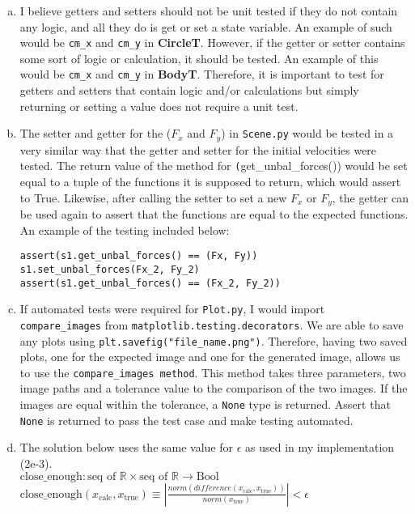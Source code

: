\documentclass[12pt]{article}
\begin{document}
\begin{enumerate}[a)]
\item I believe getters and setters should not be unit tested if they do not contain any logic, and all they do is get or set a state variable. An example of such would be \texttt{cm\_x} and \texttt{cm\_y} in \textbf{CircleT}. However, if the getter or setter contains some sort of logic or calculation, it should be tested. An example of this would be \texttt{cm\_x} and \texttt{cm\_y} in \textbf{BodyT}. Therefore, it is important to test for getters and setters that contain logic and/or calculations but simply returning or setting a value does not require a unit test.

\item The setter and getter for the ($F_x$ and $F_y$) in \texttt{Scene.py} would be tested in a very similar way that the getter and setter for the initial velocities were tested. The return value of the method for \texttt(get\_unbal\_forces()) would be set equal to a tuple of the functions it is supposed to return, which would assert to True. Likewise, after calling the setter to set a new $F_x$ or $F_y$, the getter can be used again to assert that the functions are equal to the expected functions. An example of the testing included below:
\begin{verbatim}
assert(s1.get_unbal_forces() == (Fx, Fy))
s1.set_unbal_forces(Fx_2, Fy_2)
assert(s1.get_unbal_forces() == (Fx_2, Fy_2))
\end{verbatim}

\item If automated tests were required for \texttt{Plot.py}, I would import \texttt{compare\_images} from \texttt{matplotlib.testing.decorators}. We are able to save any plots using \texttt{plt.savefig("file\_name.png")}. Therefore, having two saved plots, one for the expected image and one for the generated image, allows us to use the \texttt{compare\_images method}. This method takes three parameters, two image paths and a tolerance value to the comparison of the two images. If the images are equal within the tolerance, a \texttt{None} type is returned. Assert that \texttt{None} is returned to pass the test case and make testing automated.

\item 
The solution below uses the same value for $\epsilon$ as used in my implementation (2e-3). \\

\noindent $\text{close\_enough}: \text{seq of } \mathbb{R} \times \text{seq of } \mathbb{R} \rightarrow \text{Bool} $\\
\noindent $\text{close\_enough}(x_\text{calc}, x_\text{true}) \equiv |\frac{ norm(difference(x_\text{calc}, x_\text{true}))} {norm(x_\text{true})}| < \epsilon$



\end{enumerate}
\end{document}
